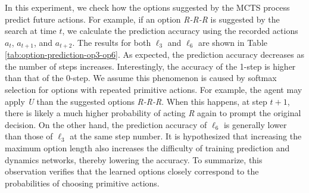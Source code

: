 In this experiment, we check how the options suggested by the MCTS process predict future actions.
For example, if an option \textit{R-R-R} is suggested by the search at time $t$, we calculate the prediction accuracy using the recorded actions $a_t$, $a_{t+1}$, and $a_{t+2}$.
The results for both $\ell_3$ and $\ell_6$ are shown in Table \ref{tab:option-prediction-op3-op6}.
As expected, the prediction accuracy decreases as the number of steps increases.
Interestingly, the accuracy of the 1-step is higher than that of the 0-step.
We assume this phenomenon is caused by softmax selection for options with repeated primitive actions.
For example, the agent may apply \textit{U} than the suggested options \textit{R-R-R}.
When this happens, at step $t+1$, there is likely a much higher probability of acting \textit{R} again to prompt the original decision.
On the other hand, the prediction accuracy of $\ell_6$ is generally lower than those of $\ell_3$ at the same step number.
It is hypothesized that increasing the maximum option length also increases the difficulty of training prediction and dynamics networks, thereby lowering the accuracy.
To summarize, this observation verifies that the learned options closely correspond to the probabilities of choosing primitive actions.

